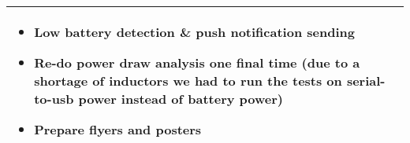 \documentclass[a4paper]{article}
\newcommand{\colWidth}{141mm}
\begin{document}
\begin{center}
\begin{tabular}{|p{\colWidth}|}
{		\begin{itemize}
			\item Low battery detection \& push notification sending
			\item Re-do power draw analysis one final time (due to a shortage of inductors we had to run the tests on serial-to-usb power instead of battery power)
			\item Prepare flyers and posters
		\end{itemize}
  }
  \\
  \hline
\end{tabular}

\end{center}
  
\end{document}
